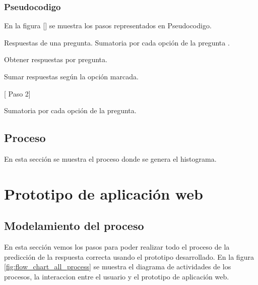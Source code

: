\subsubsection{Pseudocodigo}
En la figura [] se muestra los pasos representados en Pseudocodigo.

\begin{algorithm}
	\begin{algorithmic}[2]
		\REQUIRE Respuestas de una pregunta.  %
		\label{lin:algorithm_histogram}
		\ENSURE Sumatoria por cada opción de la pregunta .                                                       %
		
		\STATE Obtener respuestas por pregunta.
		
		\STATE Sumar respuestas según la opción marcada. 
		
	
		 [ Paso 2]
		\ENDIF
		
		\RETURN  Sumatoria por cada opción de la pregunta.
		
	\end{algorithmic}
\end{algorithm}

\subsection{Proceso}

En esta sección se muestra el proceso donde se genera el histograma.























\section{Prototipo de aplicación web} 

\subsection{Modelamiento del proceso}

En esta sección vemos los pasos para poder realizar todo el proceso de la predicción de la respuesta correcta usando el prototipo desarrollado. En la figura \ref{fig:flow_chart_all_process} se muestra el diagrama de actividades de los procesos, la interaccion entre el usuario y el prototipo de aplicación web.

